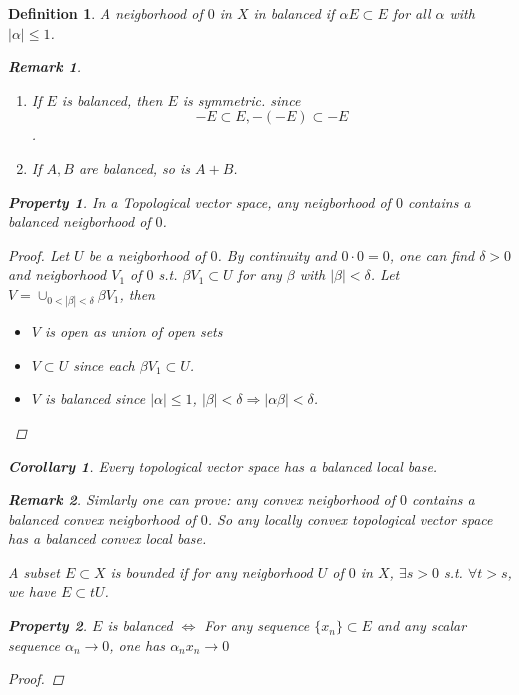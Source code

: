 \documentclass{article}
\newtheorem*{property}{Property}
\newtheorem*{definition}{Definition}
\newtheorem*{remark}{Remark}
\newtheorem*{corollary}{Corollary}
\begin{document}
\begin{definition}
  A neigborhood of $0$ in $X$ in balanced if $\alpha E \subset E$ for all $\alpha$ with $|\alpha| \le 1$.
  \begin{remark} \hfill
    \begin{enumerate}
      \item If $E$ is balanced, then $E$ is symmetric. since 
      \[-E \subset E, -(-E) \subset -E\].
      \item If $A, B$ are balanced, so is $A + B$.
    \end{enumerate}
  \end{remark}
  \begin{property}
    In a Topological vector space, any neigborhood of $0$ contains a balanced neigborhood of $0$.
    \begin{proof}
      Let $U$ be a neigborhood of $0$. By continuity and $0 \cdot 0 = 0$, 
      one can find $\delta > 0$ and neigborhood $V_1$ of $0$ 
      s.t. $\beta V_1 \subset U$ for any $\beta$ with $|\beta| < \delta$.
      Let $V = \cup_{0 < |\beta| < \delta}\beta V_1$, then 
      \begin{itemize}
        \item $V$ is open as union of open sets
        \item $V \subset U$ since each $\beta V_1 \subset U$.
        \item $V$ is balanced since $|\alpha| \le 1$, 
              $|\beta| < \delta \Rightarrow |\alpha \beta| < \delta$.
      \end{itemize}
    \end{proof}
  \end{property}
  \begin{corollary}
    Every topological vector space has a balanced local base.
    \begin{remark}
      Simlarly one can prove: any convex neigborhood of $0$ contains a balanced convex neigborhood of $0$.
      So any locally convex topological vector space has a balanced convex local base.
    \end{remark}
  \end{corollary}
  A subset $E \subset X$ is bounded if for any neigborhood $U$ of $0$ in $X$, $\exists s > 0$ s.t. 
  $\forall t > s$, we have $E \subset tU$.
  \begin{property}
    $E$ is balanced $\Leftrightarrow$ For any sequence $\{x_n\} \subset E$ and any scalar sequence $\alpha_n \rightarrow 0$,
    one has $\alpha_n x_n \rightarrow 0$
    \begin{proof} \hfill

\end{proof}
\end{property}
\end{definition}
\end{document}
